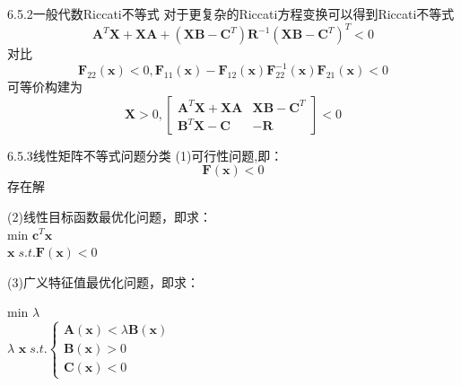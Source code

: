 \documentclass[10pt]{beamer}
\begin{document}
  \begin{frame}[allowframebreaks]{6.5.2一般代数Riccati不等式}
  对于更复杂的Riccati方程变换可以得到Riccati不等式
  \[\boldsymbol{A}^{T}\boldsymbol{X}+\boldsymbol{X}\boldsymbol{A}+\left ( \boldsymbol{X}\boldsymbol{B}-\boldsymbol{C}^{T}\right )\boldsymbol{R}^{-1}\left ( \boldsymbol{X}\boldsymbol{B}-\boldsymbol{C}^{T}\right )^{T}< 0\]
  对比
  \[\boldsymbol{F}_{22}\left ( \boldsymbol{x}\right )< 0,\boldsymbol{F}_{11}\left ( \boldsymbol{x}\right )-\boldsymbol{F}_{12}\left ( \boldsymbol{x}\right )\boldsymbol{F}_{22}^{-1}\left ( \boldsymbol{x}\right )\boldsymbol{F}_{21}\left ( \boldsymbol{x}\right )< 0\]
  可等价构建为
  \[\boldsymbol{X}> 0,\begin{bmatrix}
  \boldsymbol{A}^{T}\boldsymbol{X}+\boldsymbol{X}\boldsymbol{A} & \boldsymbol{XB}-\boldsymbol{C}^{T}\\ 
  \boldsymbol{B}^{T}\boldsymbol{X}-\boldsymbol{C}& -\boldsymbol{R}
  \end{bmatrix}< 0\]
  \end{frame}
  \begin{frame}[allowframebreaks]{6.5.3线性矩阵不等式问题分类}
  (1)可行性问题,即：
  \[\boldsymbol{F}\left ( \boldsymbol{x}\right )< 0\]
  存在解
  
  (2)线性目标函数最优化问题，即求：
  \\	\qquad \qquad\qquad\qquad\qquad\qquad min  
  $
  \boldsymbol{c}^{T}\boldsymbol{x}
  $
  \\\qquad\qquad\qquad\qquad\qquad
  $
  \boldsymbol{x}\;s.t.
  \boldsymbol{F}\left ( \boldsymbol{x}\right )< 0
  $
  
  (3)广义特征值最优化问题，即求：
  
    \qquad \qquad\qquad\qquad\qquad\qquad min 
  $
  \lambda 
  $
  \\\qquad\qquad\qquad\qquad
  $
  \lambda $ $\textbf{x}\;s.t.
  \left\{
  \begin{array}{ccc}
  \boldsymbol{A}\left ( \boldsymbol{x}\right )< \lambda \boldsymbol{B}\left ( \boldsymbol{x}\right ) \\
  \boldsymbol{B}\left ( \boldsymbol{x}\right )> 0\\
  \boldsymbol{C}\left ( \boldsymbol{x}\right )< 0 
  \end{array} 
  \right.
  $
  
  \end{frame}
  
\end{document}
